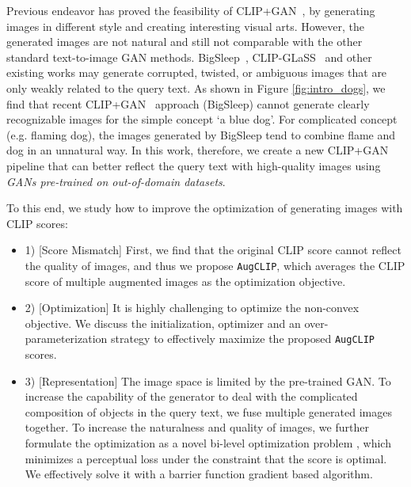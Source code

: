 \documentclass[10pt,twocolumn,letterpaper]{article}
\newcommand{\ganclip}{CLIP+GAN}
\newcommand{\ourloss}{\texttt{AugCLIP}}
\begin{document}
Previous endeavor has proved the feasibility of \ganclip~\cite{bigsleep, galatolo2021generating}, 
by generating images in different style and creating interesting visual arts.
However, the generated images are not natural and still not comparable with the other standard text-to-image GAN methods. 
BigSleep~\cite{bigsleep}, CLIP-GLaSS~\cite{galatolo2021generating} and other existing works may generate corrupted, twisted, or ambiguous images that are only weakly related to the query text.
As shown in Figure \ref{fig:intro_dogs}, 
we find that recent \ganclip~ approach (BigSleep) 
cannot generate clearly recognizable images for the simple concept `a blue dog'.
For complicated concept (e.g. flaming dog), the images generated by BigSleep tend to combine flame and dog in an unnatural way.
In this work, therefore, we create a new \ganclip~ pipeline that can better reflect the query text with high-quality images using \emph{GANs pre-trained on out-of-domain datasets}.


To this end, we study how to improve the optimization of generating images with CLIP scores:
\begin{itemize}
    \item 1) [Score Mismatch] First, we find that the original CLIP score cannot reflect the quality of images, and thus we propose \ourloss, which averages the CLIP score of multiple augmented images as the optimization objective.
    \item 2) [Optimization] It is highly challenging to optimize the non-convex objective. We discuss the initialization, optimizer and an over-parameterization strategy to effectively maximize the proposed \ourloss~ scores. 
    \item 3) [Representation] The image space is limited by the pre-trained GAN. To increase the capability of the generator to deal with the complicated composition of objects in the query text,
    we fuse multiple generated images together. To increase the naturalness and quality of images, we further formulate the optimization as a novel bi-level optimization problem \cite{solodov2007bundle},
    which minimizes a perceptual loss \cite{johnson2016perceptual} under the constraint that the  score is optimal.
    We effectively solve it with a barrier function gradient based algorithm.
\end{itemize}
 
\end{document}

